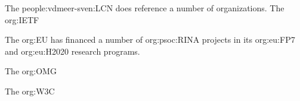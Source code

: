 The \ac{people:vdmeer-sven:LCN} does reference a number of organizations.
    The \ac{org:IETF}

    The \ac{org:EU} has financed a number of \ac{org:psoc:RINA} projects in its \ac{org:eu:FP7} and \ac{org:eu:H2020} research programs.

    The \ac{org:OMG}

    The \ac{org:W3C}

